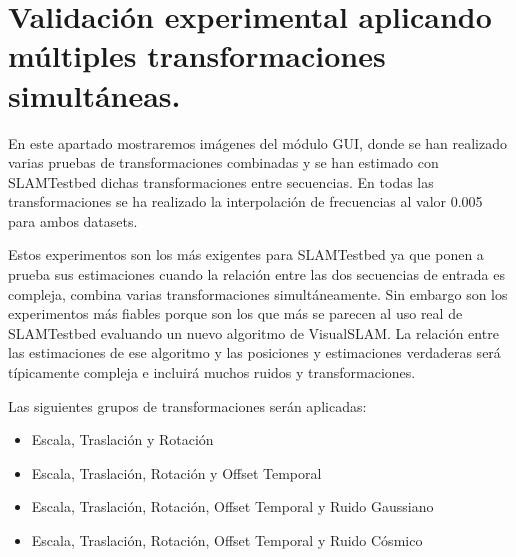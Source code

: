 \section{Validación experimental aplicando múltiples transformaciones simultáneas.}

En este apartado mostraremos imágenes del módulo GUI, donde se han realizado varias pruebas de transformaciones combinadas y se han estimado con SLAMTestbed dichas transformaciones entre secuencias.
En todas las transformaciones se ha realizado la interpolación de frecuencias al valor 0.005 para ambos datasets.

Estos experimentos son los más exigentes para SLAMTestbed ya que ponen a prueba sus estimaciones cuando la relación entre las dos secuencias de entrada es compleja, combina varias transformaciones simultáneamente. Sin embargo son los experimentos más fiables porque son los que más se parecen al uso real de SLAMTestbed evaluando un nuevo algoritmo de VisualSLAM. La relación entre las estimaciones de ese algoritmo y las posiciones y estimaciones verdaderas será típicamente compleja e incluirá muchos ruidos y transformaciones.

Las siguientes grupos de transformaciones serán aplicadas:
\begin{itemize}
	\item{Escala, Traslación y Rotación}
	\item{Escala, Traslación, Rotación y Offset Temporal}
	\item{Escala, Traslación, Rotación, Offset Temporal y Ruido Gaussiano}
	\item{Escala, Traslación, Rotación, Offset Temporal y Ruido Cósmico}
\end{itemize}


